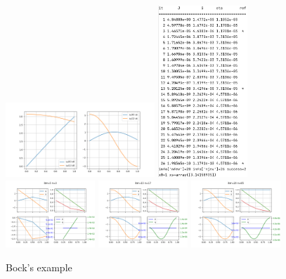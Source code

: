 \documentclass[english,12pt,a4paper]{article}
\begin{document}
\begin{figure}[htbp]
\begin{center}
\includegraphics[keepaspectratio = true, width = 0.5\textwidth] {img/bock/u0_us}\hfill
\includegraphics[keepaspectratio = true, width = 0.3\textwidth] {img/bock/info}\\\vspace{5mm}
\includegraphics[keepaspectratio = true, width = 0.3\textwidth] {img/bock/iter5}\hfill
\includegraphics[keepaspectratio = true, width = 0.3\textwidth] {img/bock/iter15}\hfill
\includegraphics[keepaspectratio = true, width = 0.3\textwidth] {img/bock/iter20}
\caption{Bock's example}
\label{default}
\end{center}
\end{figure}
%
\end{document}
